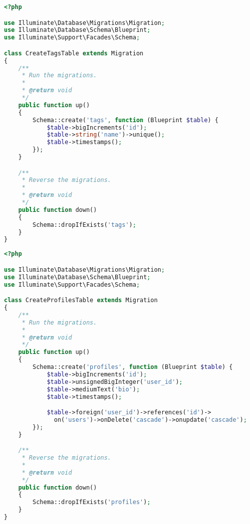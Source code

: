 \documentclass[11pt, oneside]{article}   	%
\begin{document}
\begin{lstlisting}[showstringspaces=false, title=CreateTagsTable.java, language=PHP, frame=single]
<?php

use Illuminate\Database\Migrations\Migration;
use Illuminate\Database\Schema\Blueprint;
use Illuminate\Support\Facades\Schema;

class CreateTagsTable extends Migration
{
    /**
     * Run the migrations.
     *
     * @return void
     */
    public function up()
    {
        Schema::create('tags', function (Blueprint $table) {
            $table->bigIncrements('id');
            $table->string('name')->unique();
            $table->timestamps();
        });
    }

    /**
     * Reverse the migrations.
     *
     * @return void
     */
    public function down()
    {
        Schema::dropIfExists('tags');
    }
}
\end{lstlisting}

\begin{lstlisting}[showstringspaces=false, title=CreateProfilesTable.java, language=PHP, frame=single]
<?php

use Illuminate\Database\Migrations\Migration;
use Illuminate\Database\Schema\Blueprint;
use Illuminate\Support\Facades\Schema;

class CreateProfilesTable extends Migration
{
    /**
     * Run the migrations.
     *
     * @return void
     */
    public function up()
    {
        Schema::create('profiles', function (Blueprint $table) {
            $table->bigIncrements('id');
            $table->unsignedBigInteger('user_id');
            $table->mediumText('bio');
            $table->timestamps();

            $table->foreign('user_id')->references('id')->
              on('users')->onDelete('cascade')->onupdate('cascade');
        });
    }

    /**
     * Reverse the migrations.
     *
     * @return void
     */
    public function down()
    {
        Schema::dropIfExists('profiles');
    }
}
\end{lstlisting}
\end{document}
